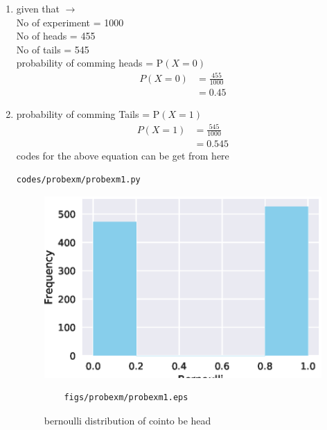 \renewcommand{\theequation}{\theenumi}
\begin{enumerate}[label=\arabic*.,ref=\thesubsection.\theenumi]
\item given that $\to$
\\
No of experiment = 1000
\\
No of heads = 455
\\
No of tails = 545
\\
probability of comming heads = P$\left(X=0\right)$
\\
\begin{align}
P\left(X=0\right) &= \frac{455}{1000}
\\
&= 0.45
\end{align}
\item probability of comming Tails = P$\left(X=1\right)$
\\
\begin{align}
 P\left(X=1\right) &= \frac{545}{1000}
\\
&= 0.545
\end{align}
codes for the above equation can be get from here
\begin{lstlisting}
codes/probexm/probexm1.py
\end{lstlisting}
\begin{figure}[!ht]
	\centering
	\includegraphics[width=\columnwidth]{./figures/probexm/probexm1.eps}
	\caption{bernoulli distribution of cointo be head}
	\label{fig:bt2}
	\begin{lstlisting}
	figs/probexm/probexm1.eps
	\end{lstlisting}
\end{figure}
\end{enumerate}